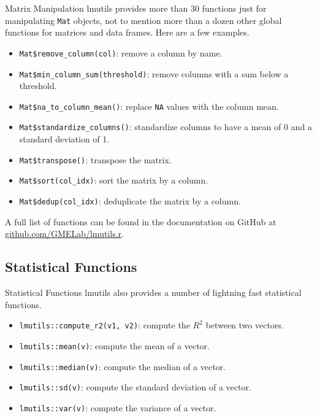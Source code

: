 \documentclass[10pt,handout]{beamer}
\begin{document}
\begin{frame}{Matrix Manipulation}
  lmutils provides more than 30 functions just for manipulating \texttt{Mat} objects, not to mention more than a dozen other global functions for matrices and data frames. Here are a few examples.
  \begin{itemize}[<+->]
    \item \texttt{Mat\$remove\_column(col)}: remove a column by name.
    \item \texttt{Mat\$min\_column\_sum(threshold)}: remove columns with a sum below a threshold.
    \item \texttt{Mat\$na\_to\_column\_mean()}: replace \texttt{NA} values with the column mean.
    \item \texttt{Mat\$standardize\_columns()}: standardize columns to have a mean of 0 and a standard deviation of 1.
    \item \texttt{Mat\$transpose()}: transpose the matrix.
    \item \texttt{Mat\$sort(col\_idx)}: sort the matrix by a column.
    \item \texttt{Mat\$dedup(col\_idx)}: deduplicate the matrix by a column.
  \end{itemize}
  A full list of functions can be found in the documentation on GitHub at \hyperlink{https://github.com/GMELab/lmutils.r}{github.com/GMELab/lmutils.r}.
\end{frame}

\subsection{Statistical Functions}
\begin{frame}{Statistical Functions}
  lmutils also provides a number of lightning fast statistical functions.
  \begin{itemize}[<+->]
    \item \texttt{lmutils::compute\_r2(v1, v2)}: compute the $R^2$ between two vectors.
    \item \texttt{lmutils::mean(v)}: compute the mean of a vector.
    \item \texttt{lmutils::median(v)}: compute the median of a vector.
    \item \texttt{lmutils::sd(v)}: compute the standard deviation of a vector.
    \item \texttt{lmutils::var(v)}: compute the variance of a vector.
  \end{itemize}
\end{frame}
\end{document}
